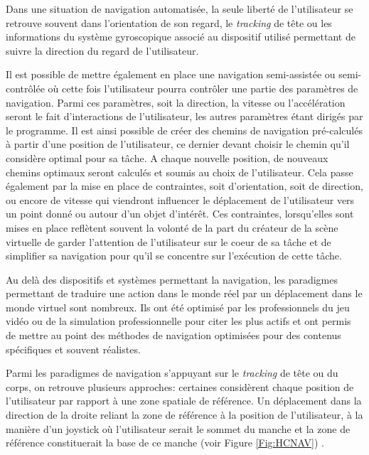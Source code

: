 Dans une situation de navigation automatisée, la seule liberté de l'utilisateur se retrouve souvent dans l'orientation de son regard, le \textit{tracking} de tête ou les informations du système gyroscopique associé au dispositif utilisé permettant de suivre la direction du regard de l'utilisateur.

Il est possible de mettre également en place une navigation semi-assistée ou semi-contrôlée où cette fois l'utilisateur pourra contrôler une partie des paramètres de navigation. Parmi ces paramètres, soit la direction, la vitesse ou l'accélération seront le fait d'interactions de l'utilisateur, les autres paramètres étant dirigés par le programme. Il est ainsi possible de créer des chemins de navigation pré-calculés à partir d'une position de l'utilisateur, ce dernier devant choisir le chemin qu'il considère optimal pour sa tâche. A chaque nouvelle position, de nouveaux chemins optimaux seront calculés et soumis au choix de l'utilisateur.
Cela passe également par la mise en place de contraintes, soit d'orientation, soit de direction, ou encore de vitesse qui viendront influencer le déplacement de l'utilisateur vers un point donné ou autour d'un objet d'intérêt. Ces contraintes, lorsqu'elles sont mises en place reflètent souvent la volonté de la part du créateur de la scène virtuelle de garder l'attention de l'utilisateur sur le coeur de sa tâche et de simplifier sa navigation pour qu'il se concentre sur l’exécution de cette tâche.


Au delà des dispositifs et systèmes permettant la navigation, les paradigmes permettant de traduire une action dans le monde réel par un déplacement dans le monde virtuel sont nombreux. Ils ont été optimisé par les professionnels du jeu vidéo ou de la simulation professionnelle pour citer les plus actifs et ont permis de mettre au point des méthodes de navigation optimisées pour des contenus spécifiques et souvent réalistes.

Parmi les paradigmes de navigation s'appuyant sur le \textit{tracking} de tête ou du corps, on retrouve plusieurs approches: certaines considèrent chaque position de l'utilisateur par rapport à une zone spatiale de référence. Un déplacement dans la direction de la droite reliant la zone de référence à la position de l'utilisateur, à la manière d'un joystick où l'utilisateur serait le sommet du manche et la zone de référence constituerait la base de ce manche (voir Figure \ref{Fig:HCNAV}) \cite{Bourdot2002HCNav}.

